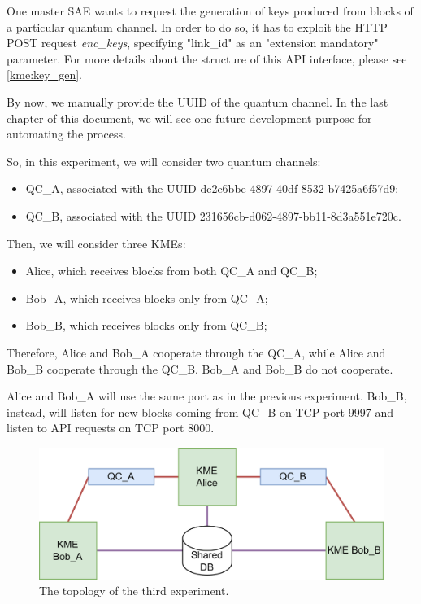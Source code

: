 One master SAE wants to request the generation of keys produced from blocks of a particular quantum channel. In order to do so, it has to exploit the HTTP POST request \textit{enc\_keys}, specifying "link\_id" as an "extension mandatory" parameter. For more details about the structure of this API interface, please see \ref{kme:key_gen}.

By now, we manually provide the UUID of the quantum channel. In the last chapter of this document, we will see one future development purpose for automating the process.

So, in this experiment, we will consider two quantum channels:
\begin{itemize}
    \item QC\_A, associated with the UUID de2e6bbe-4897-40df-8532-b7425a6f57d9;
    \item QC\_B, associated with the UUID 231656cb-d062-4897-bb11-8d3a551e720c.
\end{itemize}

Then, we will consider three KMEs:
\begin{itemize}
    \item Alice, which receives blocks from both QC\_A and QC\_B;
    \item Bob\_A, which receives blocks only from QC\_A;
    \item Bob\_B, which receives blocks only from QC\_B;
\end{itemize}

Therefore, Alice and Bob\_A cooperate through the QC\_A, while Alice and Bob\_B cooperate through the QC\_B. Bob\_A and Bob\_B do not cooperate.

Alice and Bob\_A will use the same port as in the previous experiment. Bob\_B, instead, will listen for new blocks coming from QC\_B on TCP port 9997 and listen to API requests on TCP port 8000.

\begin{figure}[H]
    \centering
    \includegraphics[width=1.0\textwidth]{Images/Third experiment.png}
    \caption{The topology of the third experiment.}
    \label{fig:third_exp}
\end{figure}

